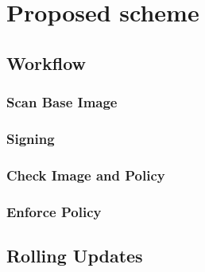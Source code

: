 \chapter{Proposed scheme}

\section{Workflow}
\subsection{Scan Base Image}
\subsection{Signing}
\subsection{Check Image and Policy}
\subsection{Enforce Policy}

\section{Rolling Updates}